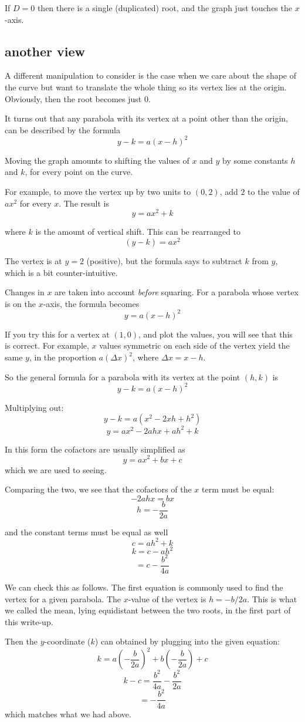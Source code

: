 \documentclass[11pt, oneside]{article}
\begin{document}
If $D = 0$ then there is a single (duplicated) root, and the graph just touches the $x$-axis.

\subsection*{another view}

A different manipulation to consider is the case when we care about the shape of the curve but want to translate the whole thing so its vertex lies at the origin.  Obviously, then the root becomes just $0$.

It turns out that any parabola with its vertex at a point other than the origin, can be described by the formula
\[ y - k = a(x - h)^2 \]

Moving the graph amounts to shifting the values of $x$ and $y$ by some constants $h$ and $k$, for every point on the curve.

For example, to move the vertex up by two units to $(0,2)$, add $2$ to the value of $ax^2$ for every $x$.  The result is
\[ y = ax^2 + k \]

where $k$ is the amount of vertical shift.  This can be rearranged to 
\[ (y - k) = ax^2 \]

The vertex is at $y = 2$ (positive), but the formula says to subtract $k$ from $y$, which is a bit counter-intuitive.

Changes in $x$ are taken into account \emph{before} squaring.  For a parabola whose vertex is on the $x$-axis, the formula becomes
\[ y = a(x-h)^2 \]

If you try this for a vertex at $(1,0)$, and plot the values, you will see that this is correct.  For example, $x$ values symmetric on each side of the vertex yield the same $y$, in the proportion $a(\Delta x)^2$, where $\Delta x = x - h$.

So the general formula for a parabola with its vertex at the point $(h,k)$ is
\[ y - k = a(x - h)^2 \]

Multiplying out:
\[ y - k = a(x^2 - 2xh + h^2) \]
\[ y = ax^2 - 2ah x + ah^2 + k \]

In this form the cofactors are usually simplified as
\[ y = ax^2 + bx + c \]
which we are used to seeing.

Comparing the two, we see that the cofactors of the $x$ term must be equal:
\[ -2ahx = bx \]
\[ h = -\frac{b}{2a} \]

and the constant terms must be equal as well
\[ c = ah^2 + k \] 
\[ k = c - ah^2 \]
\[ = c - \frac{b^2}{4a} \]

We can check this as follows.  The first equation is commonly used to find the vertex for a given parabola.  The $x$-value of the vertex is $h = -b/2a$.  This is what we called the mean, lying equidistant between the two roots, in the first part of this write-up.

Then the $y$-coordinate ($k$) can obtained by plugging into the given equation:
\[ k = a(-\frac{b}{2a})^2 + b(-\frac{b}{2a}) + c \]
\[ k - c = \frac{b^2}{4a} - \frac{b^2}{2a} \]
\[ = - \frac{b^2}{4a}  \]
which matches what we had above.
\end{document}
